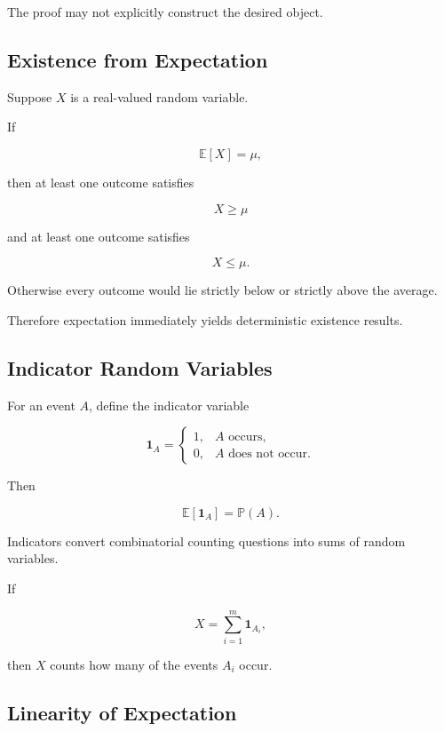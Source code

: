 The proof may not explicitly construct the desired object.

\subsection{Existence from Expectation}
\label{subsec:existence-from-expectation}

Suppose \(X\) is a real-valued random variable.

If

\[
\mathbb{E}[X]=\mu,
\]

then at least one outcome satisfies

\[
X\geq\mu
\]

and at least one outcome satisfies

\[
X\leq\mu.
\]

Otherwise every outcome would lie strictly below or strictly above the
average.

Therefore expectation immediately yields deterministic existence
results.

\subsection{Indicator Random Variables}
\label{subsec:indicator-random-variables}

For an event \(A\), define the indicator variable

\[
\boxed{
\mathbf{1}_A
=
\begin{cases}
1,&A\text{ occurs},\\
0,&A\text{ does not occur}.
\end{cases}
}
\]

Then

\[
\boxed{
\mathbb{E}[\mathbf{1}_A]
=
\mathbb{P}(A).
}
\]

Indicators convert combinatorial counting questions into sums of random
variables.

If

\[
X
=
\sum_{i=1}^{m}\mathbf{1}_{A_i},
\]

then \(X\) counts how many of the events \(A_i\) occur.

\subsection{Linearity of Expectation}
\label{subsec:linearity-expectation-combinatorics}

